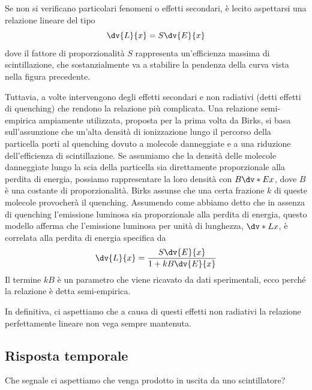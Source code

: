 Se non si verificano particolari fenomeni o effetti secondari, è lecito aspettarsi una relazione lineare del tipo
\begin{equation*}
   \dv{L}{x}=S\dv{E}{x}
\end{equation*}
dove il fattore di proporzionalità $S$ rappresenta un'efficienza massima di scintillazione, che sostanzialmente va a stabilire la pendenza della curva vista nella figura precedente.

Tuttavia, a volte intervengono degli effetti secondari e non radiativi (detti effetti di quenching) che rendono la relazione più complicata. Una relazione semi-empirica ampiamente utilizzata, proposta per la prima volta da Birks, si basa sull'assunzione che un'alta densità di ionizzazione lungo il percorso della particella porti al quenching dovuto a molecole danneggiate e a una riduzione dell'efficienza di scintillazione. Se assumiamo che la densità delle molecole danneggiate lungo la scia della particella sia direttamente proporzionale alla perdita di energia, possiamo rappresentare la loro densità con $B\dv*{E}{x}$, dove $B$ è una costante di proporzionalità. Birks assunse che una certa frazione $k$ di queste molecole provocherà il quenching. Assumendo come abbiamo detto che in assenza di quenching l'emissione luminosa sia proporzionale alla perdita di energia, questo modello afferma che l'emissione luminosa per unità di lunghezza, $\dv*{L}{x}$, è correlata alla perdita di energia specifica da
\begin{equation*}
   \dv{L}{x}=\frac{\displaystyle S\dv{E}{x}}{\displaystyle 1 + kB \dv{E}{x}}
\end{equation*}
Il termine $kB$ è un parametro che viene ricavato da dati sperimentali, ecco perché la relazione è detta semi-empirica.

In definitiva, ci aspettiamo che a causa di questi effetti non radiativi la relazione perfettamente lineare non vega sempre mantenuta.

\subsection{Risposta temporale}
Che segnale ci aspettiamo che venga prodotto in uscita da uno scintillatore?

